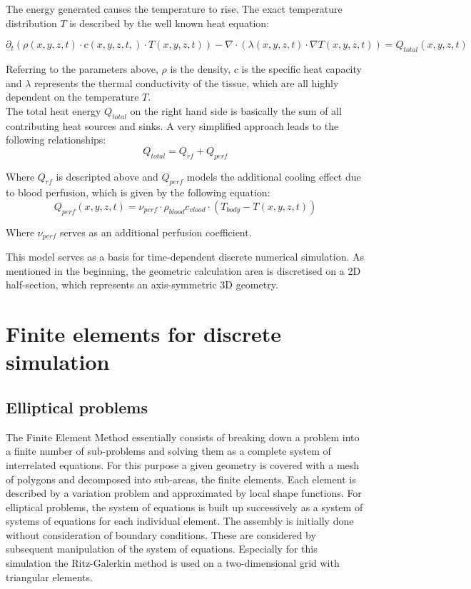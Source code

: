 \documentclass[parskip=half, titlepage=yes, 12pt, BCOR=12mm, DIV=calc]{scrartcl}
\begin{document}
The energy generated causes the temperature to rise. The exact temperature distribution $T$ is described by the well known heat equation:

\begin{equation}
    \partial_t (\rho(x,y,z,t) \cdot c(x,y,z,t,) \cdot T(x,y,z,t)) - \nabla \cdot (\lambda(x,y,z,t) \cdot \nabla T(x,y,z,t)) = Q_{total}(x,y,z,t)
\end{equation}

Referring to the parameters above, $\rho$ is the density, $c$ is the specific heat capacity and $\lambda$ represents the thermal conductivity of the tissue, which are all highly dependent on the temperature $T$. \\
The total heat energy $Q_{total}$ on the right hand side is basically the sum of all contributing heat sources and sinks. A very simplified approach leads to the following relationships:
\begin{equation}
    Q_{total} = Q_{rf} + Q_{perf}
\end{equation}

Where $Q_{rf}$ is descripted above and $Q_{perf}$ models the additional cooling effect due to blood perfusion, which is given by the following equation:
\begin{equation}
    Q_{perf}(x,y,z,t) = \nu_{perf} \cdot \rho_{blood} c_{vlood} \cdot (T_{body} - T(x,y,z,t))
    \label{q_perf}
\end{equation}
 
 Where $\nu_{perf}$ serves as an additional perfusion coefficient.

This model serves as a basis for time-dependent discrete numerical simulation. As mentioned in the beginning, the geometric calculation area is discretised on a 2D half-section, which represents an axis-symmetric 3D geometry. 


\section{Finite elements for discrete simulation}

\subsection{Elliptical problems}
The Finite Element Method essentially consists of breaking down a problem into a finite number of sub-problems and solving them as a complete system of interrelated equations. For this purpose a given geometry is covered with a mesh of polygons and decomposed into sub-areas, the finite elements. Each element is described by a variation problem and approximated by local shape functions. For elliptical problems, the system of equations is built up successively as a system of systems of equations for each individual element. The assembly is initially done without consideration of boundary conditions. These are considered by subsequent manipulation of the system of equations. Especially for this simulation the Ritz-Galerkin method is used on a two-dimensional grid with triangular elements. 
\end{document}
